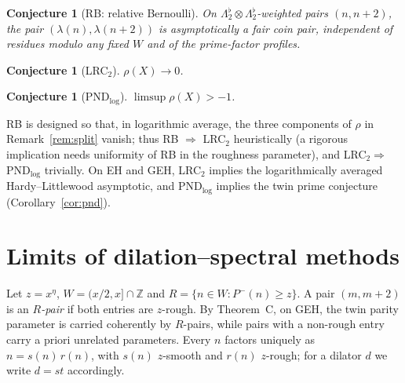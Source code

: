 \documentclass[11pt]{amsart}
\newtheorem{conjecture}[theorem]{Conjecture}
\theoremstyle{definition}
\theoremstyle{remark}
\newcommand{\Z}{\mathbb{Z}}
\newcommand{\Lflat}{\Lambda_2^{\flat}}
\begin{document}
\begin{conjecture}[RB: relative Bernoulli]
On $\Lflat\otimes\Lflat$-weighted pairs $(n,n+2)$, the pair $(\lambda(n),\lambda(n+2))$ is asymptotically a fair coin pair, independent of residues modulo any fixed $W$ and of the prime-factor profiles.
\end{conjecture}
\begin{conjecture}[LRC$_2$]
$\rho(X)\to0$.
\end{conjecture}
\begin{conjecture}[PND$_{\log}$]
$\limsup\rho(X)>-1$.
\end{conjecture}

RB is designed so that, in logarithmic average, the three components of $\rho$ in Remark~\ref{rem:split} vanish; thus RB $\Rightarrow$ LRC$_2$ heuristically (a rigorous implication needs uniformity of RB in the roughness parameter), and LRC$_2\Rightarrow$ PND$_{\log}$ trivially. On EH and GEH, LRC$_2$ implies the logarithmically averaged Hardy--Littlewood asymptotic, and PND$_{\log}$ implies the twin prime conjecture (Corollary~\ref{cor:pnd}).

\section{Limits of dilation--spectral methods}\label{sec:limits}

Let $z=x^\eta$, $W=(x/2,x]\cap\Z$ and $R=\{n\in W:P^-(n)\ge z\}$. A pair $(m,m+2)$ is an \emph{$R$-pair} if both entries are $z$-rough. By Theorem~C, on GEH, the twin parity parameter is carried coherently by $R$-pairs, while pairs with a non-rough entry carry a priori unrelated parameters. Every $n$ factors uniquely as $n=s(n)\,r(n)$, with $s(n)$ $z$-smooth and $r(n)$ $z$-rough; for a dilator $d$ we write $d=st$ accordingly.
\end{document}
